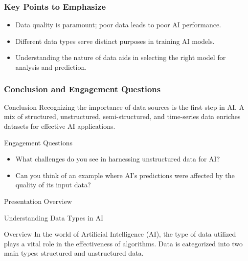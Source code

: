 \documentclass[aspectratio=169]{beamer}
\begin{document}
\begin{frame}[fragile]
    \frametitle{Key Points to Emphasize}
    \begin{itemize}
        \item Data quality is paramount; poor data leads to poor AI performance.
        \item Different data types serve distinct purposes in training AI models.
        \item Understanding the nature of data aids in selecting the right model for analysis and prediction.
    \end{itemize}
\end{frame}

\begin{frame}[fragile]
    \frametitle{Conclusion and Engagement Questions}
    \begin{block}{Conclusion}
        Recognizing the importance of data sources is the first step in AI. A mix of structured, unstructured, semi-structured, and time-series data enriches datasets for effective AI applications.
    \end{block}
    \begin{block}{Engagement Questions}
        \begin{itemize}
            \item What challenges do you see in harnessing unstructured data for AI?
            \item Can you think of an example where AI's predictions were affected by the quality of its input data?
        \end{itemize}
    \end{block}
\end{frame}

\begin{frame}[fragile]{Presentation Overview}
  \tableofcontents[hideallsubsections]
\end{frame}

\begin{frame}[fragile]{Understanding Data Types in AI}
    \begin{block}{Overview}
        In the world of Artificial Intelligence (AI), the type of data utilized plays a vital role in the effectiveness of algorithms. Data is categorized into two main types: structured and unstructured data.
    \end{block}
\end{frame}
\end{document}
